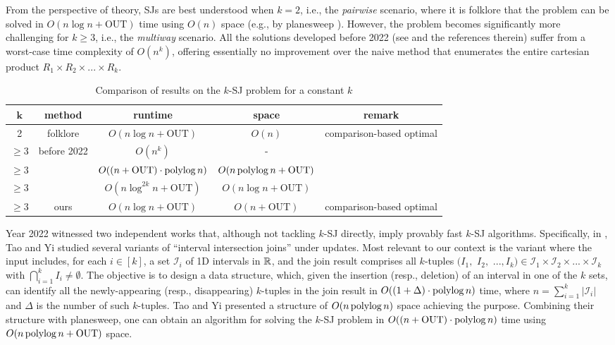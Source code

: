 \documentclass[sigconf]{acmart}
\def\vgap{\vspace{1mm}}
\def\figcapdown{\vspace{-0mm}}
\def\I{\mathcal{I}}
\def\out{\mathrm{OUT}}
\begin{document}
\vgap

From the perspective of theory, SJs are best understood when $k = 2$, i.e., the {\em pairwise} scenario, where it is folklore that the problem can be solved in $O(n \log n + \out)$ time using $O(n)$ space (e.g., by planesweep \cite{bcko08}). However, the problem becomes significantly more challenging for $k \ge 3$, i.e., the {\em multiway} scenario. All the solutions developed  before 2022 (see \cite{gcn+13,mp98,mp01,pmt99} and the references therein) suffer from a worst-case time complexity of $O(n^k)$, offering essentially no improvement over the naive method that enumerates the entire cartesian product $R_1 \times R_2 \times ... \times R_k$.


\begin{table} 
    \begin{tabular}{c|c|c|c|c} 
        $\bm{k}$ & {\bf method} & {\bf runtime} & {\bf space} & {\bf remark} \\
        \hline\hline 
        2 & folklore & $O(n \log n + \out)$ & $O(n)$ & comparison-based optimal \\ 
        \hline
        $\ge 3$ & before 2022 & $O(n^k)$ & - & \\
        $\ge 3$ & \cite{ty22} & $O((n + \out) \cdot \polylog n)$ & $O(n \polylog n + \out)$ & \\
        $\ge 3$ & \cite{kcko22} & $O(n \log^{2k} n + \out)$ & $O(n \log n + \out)$ & \\
        \hline
        $\ge 3$ & ours & $O(n \log n + \out)$ & $O(n + \out)$ & comparison-based optimal
    \end{tabular}
    
    \vspace{3mm}
    \caption{Comparison of results on the $k$-SJ problem for a constant $k$}
    \label{tab:results-com}
    \figcapdown
\end{table}

\vgap

Year 2022 witnessed two independent works \cite{ty22,kcko22} that, although not tackling $k$-SJ directly, imply provably fast $k$-SJ algorithms. Specifically, in \cite{ty22}, Tao and Yi studied several variants of ``interval intersection joins'' under updates. Most relevant to our context is the variant where the input includes, for each $i \in [k]$, a set $\I_i$ of 1D intervals in $\mathbb{R}$, and the join result comprises all $k$-tuples $(I_1,$ $I_2,$ $..., I_k) \in \I_1 \times \I_2 \times ... \times \I_k$ with $\bigcap_{i=1}^k I_i \neq \emptyset$. The objective is to design a data structure, which, given the insertion (resp., deletion) of an interval in one of the $k$ sets, can identify all the newly-appearing (resp., disappearing) $k$-tuples in the join result in $O((1+\Delta) \cdot \operatorname*{polylog} n)$ time, where $n = \sum_{i=1}^k |\I_i|$ and $\Delta$ is the number of such $k$-tuples. Tao and Yi \cite{ty22} presented a structure of $O(n \operatorname*{polylog} n)$ space achieving the purpose. Combining their structure with planesweep, one can obtain an algorithm for solving the $k$-SJ problem in $O((n + \out) \cdot \polylog n)$ time using $O(n \polylog n + \out)$ space.
\end{document}
